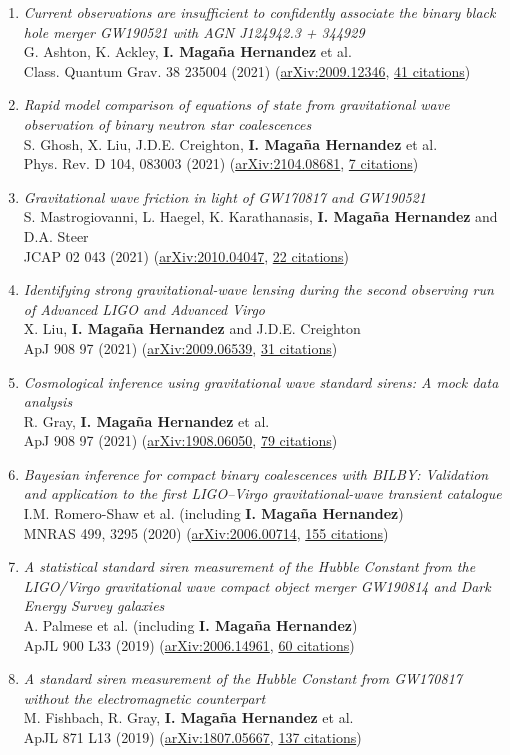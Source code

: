 \documentclass[letterpaper,10pt]{article}
\newcommand{\publicationJournal}[6]{
\begin{tabularx}
		\emph{#1} \\
		#2 \\
		#3 (\href{#4}{#5}, \underline{#6 citations})
\end{tabularx}\vspace{-3pt}}
\begin{document}
\begin{enumerate}
\item
    \publicationJournal{Current observations are insufficient to confidently associate the binary black hole merger GW190521 with AGN J124942.3 + 344929}{G. Ashton, K. Ackley, \textbf{I. Maga\~na Hernandez} et al.}{Class. Quantum Grav. 38 235004 (2021)}{https://arxiv.org/abs/2009.12346}{arXiv:2009.12346}{41}
\item
    \publicationJournal{Rapid model comparison of equations of state from gravitational wave observation of binary neutron star coalescences}{S. Ghosh, X. Liu, J.D.E. Creighton, \textbf{I. Maga\~na Hernandez} et al.}{Phys. Rev. D 104, 083003 (2021)}{https://arxiv.org/abs/2104.08681}{arXiv:2104.08681}{7}
\item
    \publicationJournal{Gravitational wave friction in light of GW170817 and GW190521}{S. Mastrogiovanni, L. Haegel, K. Karathanasis, \textbf{I. Maga\~na Hernandez} and D.A. Steer}{JCAP 02 043 (2021)}{https://arxiv.org/abs/2010.04047}{arXiv:2010.04047}{22}
\item
    \publicationJournal{Identifying strong gravitational-wave lensing during the second observing run of Advanced LIGO and Advanced Virgo}{X. Liu, \textbf{I. Maga\~na Hernandez} and J.D.E. Creighton}{ApJ 908 97 (2021)}{https://arxiv.org/abs/2009.06539}{arXiv:2009.06539}{31}
\item
    \publicationJournal{Cosmological inference using gravitational wave standard sirens: A mock data analysis}{R. Gray, \textbf{I. Maga\~na Hernandez} et al.}{ApJ 908 97 (2021)}{https://arxiv.org/abs/1908.06050}{arXiv:1908.06050}{79}
\item
    \publicationJournal{Bayesian inference for compact binary coalescences with BILBY: Validation and application to the first LIGO--Virgo gravitational-wave transient catalogue}{I.M. Romero-Shaw et al. (including \textbf{I. Maga\~na Hernandez})}{MNRAS 499, 3295 (2020)}{https://arxiv.org/abs/2006.00714}{arXiv:2006.00714}{155}
\item
    \publicationJournal{A statistical standard siren measurement of the Hubble Constant from the LIGO/Virgo gravitational wave compact object merger GW190814 and Dark Energy Survey galaxies}{A. Palmese et al. (including \textbf{I. Maga\~na Hernandez})}{ApJL 900 L33 (2019)}{https://arxiv.org/abs/2006.14961}{arXiv:2006.14961}{60}
\item
    \publicationJournal{A standard siren measurement of the Hubble Constant from GW170817 without the electromagnetic counterpart}{M. Fishbach, R. Gray, \textbf{I. Maga\~na Hernandez} et al.}{ApJL 871 L13 (2019)}{https://arxiv.org/abs/1807.05667}{arXiv:1807.05667}{137}
\end{enumerate}
\end{document}
